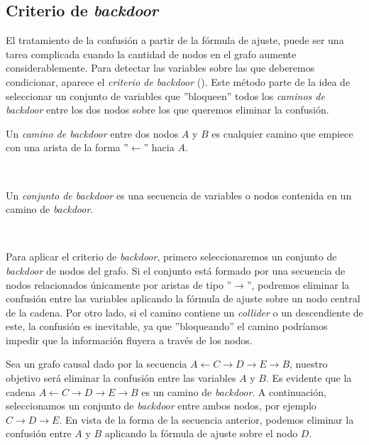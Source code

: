 \documentclass[oneside,openright,titlepage,numbers=noenddot,openany,headinclude,footinclude=true,
cleardoublepage=empty,abstractoff,BCOR=5mm,paper=a4,fontsize=12pt,main=spanish]{scrreprt}
\begin{document}
\subsection*{Criterio de \textit{backdoor}}

El tratamiento de la confusión a partir de la fórmula de ajuste, puede ser una tarea complicada cuando la cantidad de nodos en el grafo aumente considerablemente. Para detectar las variables sobre las que deberemos condicionar, aparece el \textit{criterio de backdoor} (\cite{causality2000}). Este método parte de la idea de seleccionar un conjunto de variables que ''bloqueen'' todos los \textit{caminos de backdoor} entre los dos nodos sobre los que queremos eliminar la confusión.\\

\begin{definition}
Un \textit{camino de backdoor} entre dos nodos $A$ y $B$ es cualquier camino que empiece con una arista de la forma ''$\leftarrow$'' hacia $A$.
\end{definition}\

\begin{definition}
Un \textit{conjunto de backdoor} es una secuencia de variables o nodos contenida en un camino de \textit{backdoor}.
\end{definition}\

Para aplicar el criterio de \textit{backdoor}, primero seleccionaremos un conjunto de \textit{backdoor} de nodos del grafo. Si el conjunto está formado por una secuencia de nodos relacionados únicamente por aristas de tipo ''$\to$'', podremos eliminar la confusión entre las variables aplicando la fórmula de ajuste sobre un nodo central de la cadena. Por otro lado, si el camino contiene un \textit{collider} o un descendiente de este, la confusión es inevitable, ya que ''bloqueando'' el camino podríamos impedir que la información fluyera a través de los nodos.

\begin{example}
Sea un grafo causal dado por la secuencia $A \leftarrow C \to D \to E \to B$, nuestro objetivo será eliminar la confusión entre las variables $A$ y $B$. Es evidente que la cadena $A \leftarrow C \to D \to E \to B$ es un camino de \textit{backdoor}. A continuación, seleccionamos un conjunto de \textit{backdoor} entre ambos nodos, por ejemplo $C \to D \to E$. En vista de la forma de la secuencia anterior, podemos eliminar la confusión entre $A$ y $B$ aplicando la fórmula de ajuste sobre el nodo $D$.
\end{example}
\end{document}
